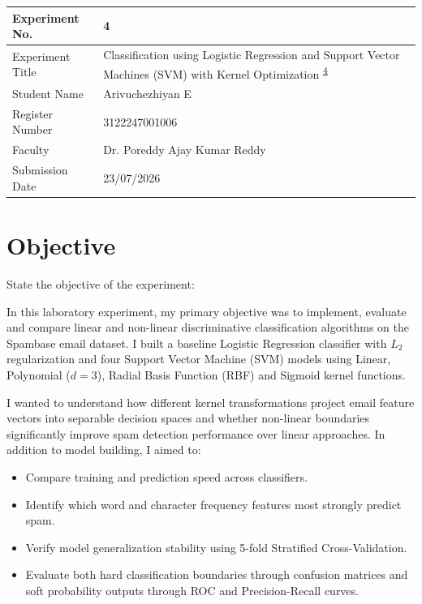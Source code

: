 \documentclass[12pt,a4paper]{article}
\begin{document}

\begin{tabular}{|p{4cm}|p{11cm}|}
\hline
Experiment No. & 4 \\ \hline
Experiment Title & Classification using Logistic Regression and Support Vector Machines (SVM) with Kernel Optimization \textsuperscript{\href{https://github.com/arivuchezhiyan/Machine_Learning/tree/main/experiment_4}{4}} \\ \hline
Student Name & Arivuchezhiyan E \\ \hline
Register Number & 3122247001006 \\ \hline
Faculty & Dr. Poreddy Ajay Kumar Reddy \\ \hline
Submission Date & 23/07/2026 \\ \hline
\end{tabular}

\vspace{0.5cm}

\section{Objective}
State the objective of the experiment:

In this laboratory experiment, my primary objective was to implement, evaluate and compare linear and non-linear discriminative classification algorithms on the Spambase email dataset. I built a baseline Logistic Regression classifier with $L_2$ regularization and four Support Vector Machine (SVM) models using Linear, Polynomial ($d=3$), Radial Basis Function (RBF) and Sigmoid kernel functions.

I wanted to understand how different kernel transformations project email feature vectors into separable decision spaces and whether non-linear boundaries significantly improve spam detection performance over linear approaches. In addition to model building, I aimed to:
\begin{itemize}
\item Compare training and prediction speed across classifiers.
\item Identify which word and character frequency features most strongly predict spam.
\item Verify model generalization stability using 5-fold Stratified Cross-Validation.
\item Evaluate both hard classification boundaries through confusion matrices and soft probability outputs through ROC and Precision-Recall curves.
\end{itemize}
\end{document}
